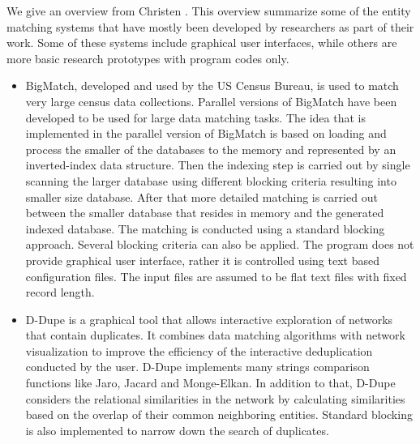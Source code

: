 We give an overview from Christen \cite{Chri12}. This overview summarize some of the entity matching systems that have mostly been developed by researchers as part of their work. Some of these systems include graphical user interfaces, while others are more basic research prototypes with program codes only.

\begin{itemize}

\item BigMatch\cite{Yanc07}, developed and used by the US Census Bureau,  is used to match very large census data collections. Parallel versions of BigMatch have been developed to be used for large data matching tasks. The idea that is implemented in the parallel version of BigMatch is based on loading and process the smaller of the databases to the memory and represented by an inverted-index data structure. Then the indexing step is carried out by single scanning the larger database using different blocking criteria resulting into smaller size database. After that more detailed matching is carried out between the smaller database that resides in memory and the generated indexed database. The matching is conducted using a standard blocking approach. Several blocking criteria can also be applied. The program does not provide graphical user interface, rather it is controlled using text based configuration files. The input files are assumed to be flat text files with fixed record length.


\item D-Dupe\cite{BLG*06} is a graphical tool that allows interactive exploration of networks that contain duplicates. It combines data matching algorithms with network visualization to improve the efficiency of the interactive deduplication conducted by the user. D-Dupe implements many strings comparison functions like Jaro, Jacard and Monge-Elkan. In addition to that, D-Dupe considers the relational similarities in the network by calculating similarities based on the overlap of their common neighboring entities. Standard blocking is also implemented to narrow down the search of duplicates.   


\end{itemize}

